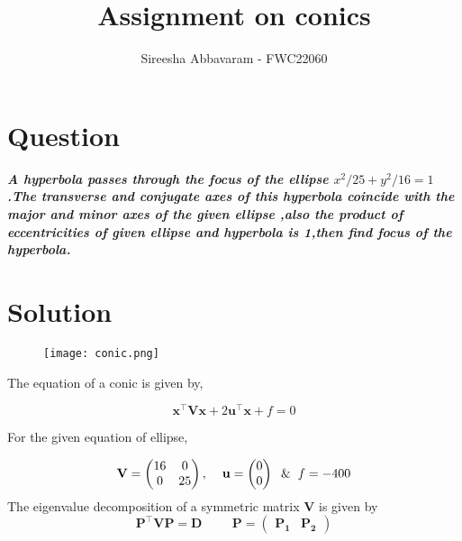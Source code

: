 \documentclass[journal,12pt,twocolumn]
{IEEEtran}
\title{\textbf{\\Assignment on conics}}
\author{Sireesha Abbavaram - FWC22060}
\let\vec\mathbf
\newcommand{\myvec}[1]{\ensuremath{\begin{pmatrix}#1\end{pmatrix}}}
\begin{document}
\maketitle


\section{Question}\vspace{2mm}
\textbf{\textit{A hyperbola passes through the focus of the ellipse $x^2/25+y^2/16=1$.The transverse and conjugate axes of this hyperbola coincide with the major and minor axes of the given ellipse ,also the product of eccentricities of given ellipse and hyperbola is 1,then find focus of the hyperbola. 
}}
\vspace{5mm}

\section{Solution}

\begin{figure}[h!]
\centering
\texttt{[image: conic.png]}
\centering
\end{figure}

\begin{center}
The equation of a conic  is given by,
\end{center}
\begin{equation}
\vec{x}^{\top}\vec{V}\vec{x}+2\vec{u}^{\top}\vec{x}+f=0
\label{eq-1-}
\end{equation}

For the given equation of ellipse,


\begin{equation}
\vec{V} = \begin{pmatrix} 
	16 & 0 \\
	0 & 25 \\
	\end{pmatrix}, \hspace{4mm} \vec{u} = \myvec{0 \\ 0} \hspace{2mm} \& \hspace{2mm} f = -400
\label{eq-2-}
\end{equation}
The eigenvalue decomposition of a symmetric matrix $\vec{V}$ is given by
\begin{equation}
\vec{P}^{\top}\vec{V}\vec{P} = \vec{D} \hspace{1cm} 
\vec{P} = \myvec{\vec{P_1} & \vec{P_2}}
\label{eq-3-}
\end{equation}
\end{document}

